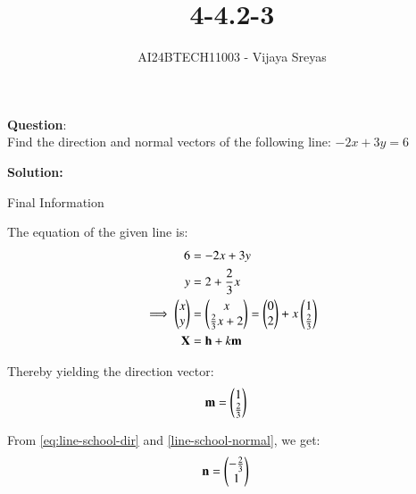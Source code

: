 \documentclass[journal]{IEEEtran}
\begin{document}

\vspace{3cm}

\title{4-4.2-3}
\author{AI24BTECH11003 - Vijaya Sreyas
}
{\let\newpage\relax\maketitle}

\renewcommand{\thefigure}{\theenumi}
\renewcommand{\thetable}{\theenumi}
\setlength{\intextsep}{10pt} %


\renewcommand{\thetable}{\theenumi}


\textbf{Question}:\\
Find the direction and normal vectors of the following line: $-2x+3y=6$

\textbf{Solution: }

\begin{table}[h!]    
  \centering
  
  \caption{Final Information}
  \label{4-4.2-3-tab-0}
\end{table}

The equation of the given line is:
\begin{align}
    6 &= -2x + 3y \\
    y &= 2 + \frac{2}{3}x \\
    \implies \begin{pmatrix}x \\ y\end{pmatrix} &= \begin{pmatrix}x \\ \frac{2}{3}x + 2\end{pmatrix} = \begin{pmatrix}0 \\ 2\end{pmatrix} + x\begin{pmatrix}1 \\ \frac{2}{3}\end{pmatrix} \\
	\mathbf{X} &= \mathbf{h} + k\mathbf{m}
\end{align}

Thereby yielding the direction vector:
\begin{align}
    \mathbf{m} &= \begin{pmatrix}1 \\ \frac{2}{3}\end{pmatrix} 
\end{align}

From \eqref{eq:line-school-dir} and \eqref{line-school-normal}, we get:
\begin{align}
    \mathbf{n} &= \begin{pmatrix}-\frac{2}{3} \\ 1\end{pmatrix}
\end{align}
\end{document}
